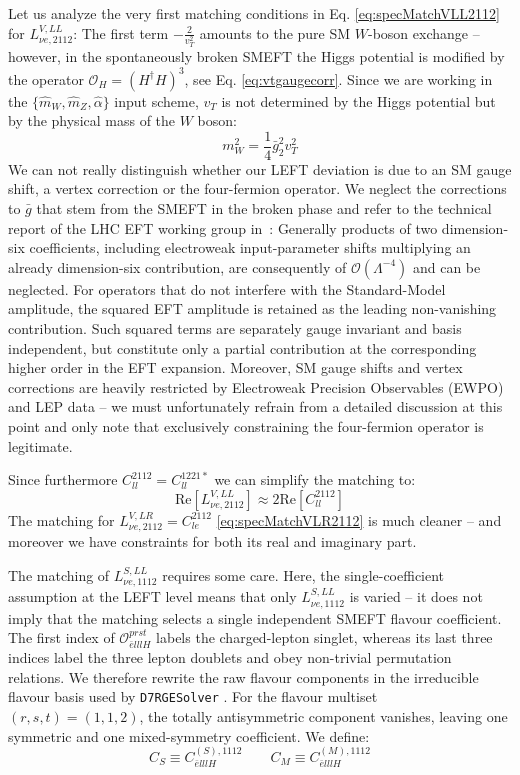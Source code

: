 Let us analyze the very first matching conditions in Eq. \ref{eq:specMatchVLL2112} for $ L^{V,LL}_{\nu e,2112}$: The first term $-\tfrac{2}{v_T^2}$ amounts to the pure SM $W$-boson exchange -- however, in the spontaneously broken SMEFT the Higgs potential is modified by the operator $\mathcal{O}_H = (H^\dagger H)^3$, see Eq. \ref{eq:vtgaugecorr}. Since we are working in the  $\{\hat{m}_W, \hat{m}_Z, \hat{\alpha}\}$ input scheme, $v_T$ is not determined by the Higgs potential but by the physical mass of the $W$ boson:
\begin{equation}
    m_W^2 = \frac{1}{4} \bar{g}_2^2 v_T^2
\end{equation}
We can not really distinguish whether our LEFT deviation is due to an SM gauge shift, a vertex correction or the four-fermion operator. We  neglect the corrections to $\bar g$ that stem from the SMEFT in the broken phase and refer to the technical report of the LHC EFT working group in~\cite{brivio2022truncation}: Generally products of two dimension-six coefficients, including electroweak input-parameter shifts multiplying an already dimension-six contribution, are consequently of $\mathcal O(\Lambda^{-4})$ and can be neglected. 
For operators that do not interfere with the Standard-Model amplitude, the squared EFT amplitude is retained as the leading non-vanishing contribution. Such squared terms are separately gauge invariant and basis independent, but constitute only a partial contribution at the
corresponding higher order in the EFT expansion. Moreover, SM gauge shifts and vertex corrections are heavily restricted by Electroweak Precision Observables (EWPO) and LEP data -- we must unfortunately refrain from a detailed discussion at this point and only note that exclusively constraining the four-fermion operator is legitimate.\par
Since furthermore $C_{ll}^{2112}=C_{ll}^{1221*}$ we can simplify the matching to:
\begin{equation}
    \text{Re}[L^{V,LL}_{\nu e,2112}]\approx 2\text{Re}[C_{ll}^{2112}]
\end{equation}
The matching for $L^{V,LR}_{\nu e,2112} = C_{le}^{2112}$ \ref{eq:specMatchVLR2112} is much cleaner -- and moreover we have constraints for both its real and imaginary part.\par 
The matching of \(L_{\nu e,1112}^{S,LL}\) requires some
care. Here, the single-coefficient assumption at the LEFT level means
that only \(L_{\nu e,1112}^{S,LL}\) is varied -- it does not imply that the matching selects a single independent SMEFT flavour coefficient. The first index of \(\mathcal O_{\bar elllH}^{prst}\) labels the
charged-lepton singlet, whereas its last three indices label the three lepton doublets and obey non-trivial permutation relations. We therefore rewrite the raw flavour components in the irreducible flavour basis used by \texttt{D7RGESolver} \parencite{liao2025rge}. For the flavour multiset \((r,s,t)=(1,1,2)\), the totally antisymmetric component vanishes, leaving one symmetric and one mixed-symmetry coefficient. We define:
\begin{equation}
     C_S\equiv C_{\bar elllH}^{(S),1112}
 \qquad
 C_M\equiv C_{\bar elllH}^{(M),1112}
\end{equation}

